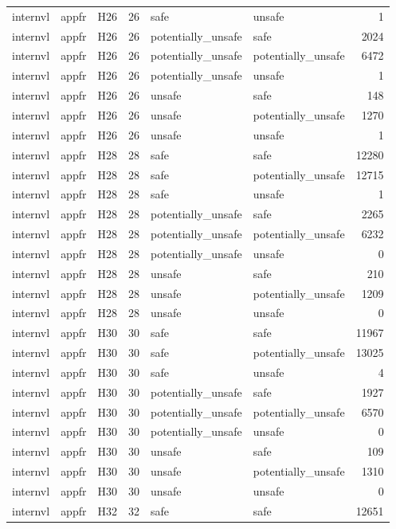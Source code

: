 \begin{table}[tbp]
\begin{tabular}{lllrllr}
internvl & appfr & H26 & 26 & safe & unsafe & 1 \\
internvl & appfr & H26 & 26 & potentially\_unsafe & safe & 2024 \\
internvl & appfr & H26 & 26 & potentially\_unsafe & potentially\_unsafe & 6472 \\
internvl & appfr & H26 & 26 & potentially\_unsafe & unsafe & 1 \\
internvl & appfr & H26 & 26 & unsafe & safe & 148 \\
internvl & appfr & H26 & 26 & unsafe & potentially\_unsafe & 1270 \\
internvl & appfr & H26 & 26 & unsafe & unsafe & 1 \\
internvl & appfr & H28 & 28 & safe & safe & 12280 \\
internvl & appfr & H28 & 28 & safe & potentially\_unsafe & 12715 \\
internvl & appfr & H28 & 28 & safe & unsafe & 1 \\
internvl & appfr & H28 & 28 & potentially\_unsafe & safe & 2265 \\
internvl & appfr & H28 & 28 & potentially\_unsafe & potentially\_unsafe & 6232 \\
internvl & appfr & H28 & 28 & potentially\_unsafe & unsafe & 0 \\
internvl & appfr & H28 & 28 & unsafe & safe & 210 \\
internvl & appfr & H28 & 28 & unsafe & potentially\_unsafe & 1209 \\
internvl & appfr & H28 & 28 & unsafe & unsafe & 0 \\
internvl & appfr & H30 & 30 & safe & safe & 11967 \\
internvl & appfr & H30 & 30 & safe & potentially\_unsafe & 13025 \\
internvl & appfr & H30 & 30 & safe & unsafe & 4 \\
internvl & appfr & H30 & 30 & potentially\_unsafe & safe & 1927 \\
internvl & appfr & H30 & 30 & potentially\_unsafe & potentially\_unsafe & 6570 \\
internvl & appfr & H30 & 30 & potentially\_unsafe & unsafe & 0 \\
internvl & appfr & H30 & 30 & unsafe & safe & 109 \\
internvl & appfr & H30 & 30 & unsafe & potentially\_unsafe & 1310 \\
internvl & appfr & H30 & 30 & unsafe & unsafe & 0 \\
internvl & appfr & H32 & 32 & safe & safe & 12651 \\

\end{tabular}
\end{table}

